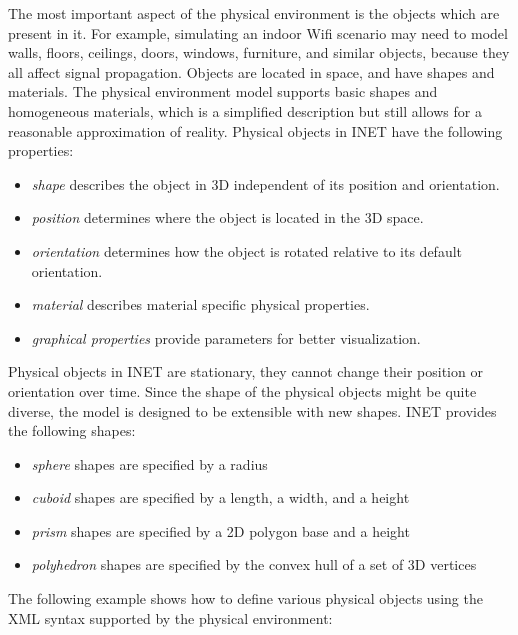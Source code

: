 The most important aspect of the physical environment is the objects which
are present in it. For example, simulating an indoor Wifi scenario may need
to model walls, floors, ceilings, doors, windows, furniture, and similar
objects, because they all affect signal propagation. Objects are located in
space, and have shapes and materials. The physical environment model
supports basic shapes and homogeneous materials, which is a simplified
description but still allows for a reasonable approximation of reality.
Physical objects in INET have the following properties:

\begin{itemize}
        \item \emph{shape} describes the object in 3D independent of its position and orientation.
        \item \emph{position} determines where the object is located in the 3D space.
        \item \emph{orientation} determines how the object is rotated relative to its default orientation.
        \item \emph{material} describes material specific physical properties.
        \item \emph{graphical properties} provide parameters for better visualization.
\end{itemize}

Physical objects in INET are stationary, they cannot change their position
or orientation over time. Since the shape of the physical objects might be
quite diverse, the model is designed to be extensible with new shapes.
INET provides the following shapes:

\begin{itemize}
        \item \emph{sphere} shapes are specified by a radius
        \item \emph{cuboid} shapes are specified by a length, a width, and a height
        \item \emph{prism} shapes are specified by a 2D polygon base and a height
        \item \emph{polyhedron} shapes are specified by the convex hull of a set of 3D vertices
\end{itemize}

The following example shows how to define various physical objects using
the XML syntax supported by the physical environment:


